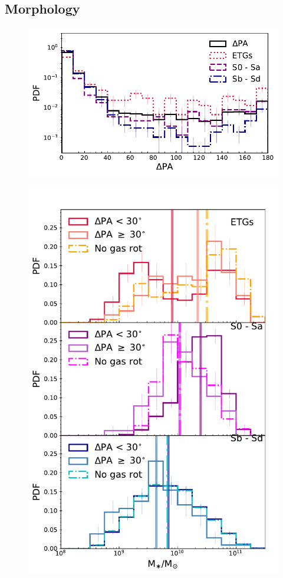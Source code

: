 \documentclass[fleqn,usenatbib]{mnras}
\begin{document}
\subsection{Morphology}

\begin{figure}
	\includegraphics[width=\linewidth]{morph/delPA_morph.pdf}
    \caption{}
    \label{fig:morph_PA}
\end{figure}

\begin{figure}
	\includegraphics[width=\linewidth]{morph/delPA_stelM_morph.pdf}
    \caption{}
    \label{fig:morph_stelM}
\end{figure}
\end{document}
